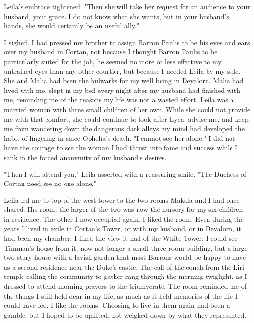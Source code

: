\documentclass{article}
\begin{document}
Leila's embrace tightened. "Then she will take her request for an audience to your husband, your grace. I do not know what she wants, but in your husband's hands, she would certainly be an useful ally." 

I sighed. I had pressed my brother to assign Barron Paulis to be his eyes and ears over my husband in Cortan, not because I thought Barron Paulis to be particularly suited for the job, he seemed no more or less effective to my untrained eyes than any other courtier, but because I needed Leila by my side. She and Malia had been the bulwarks for my well being in Deyalorn. Malia had lived with me, slept in my bed every night after my husband had finished with me, reminding me of the reasons my life was not a wasted effort. Leila was a married woman with three small children of  her own. While she could not provide me with that comfort, she could continue to look after Lyca, advise me, and keep me from wandering down the dangerous dark alleys my mind had developed the habit of lingering in since Ophelia's death. "I cannot see her alone." I did not have the courage to see the woman I had thrust into fame and success while I sank in the forced anonymity of my husband's desires. 

"Then I will attend you," Leila asserted with a reassuring smile. "The Duchess of Cortan need see no one alone."

Leila led me to top of the west tower to the two rooms Makala and I had once shared. His room, the larger of the two was now the nursery for my six children in residence. The other I now occupied again. I liked the room. Even during the years I lived in exile in Cortan's Tower, or with my husband, or in Deyalorn, it had been my chamber. I liked the view it had of the White Tower. I could see Timmon's house from it, now not longer a small three room building, but a large two story house with a lavish garden that most Barrons would be happy to have as a second residence near the Duke's castle. The call of the conch from the Liri temple calling the community to gather rang through the morning twiglight, as I dressed to attend morning prayers to the triumverate. The room reminded me of the things I still held dear in my life, as much as it held memories of the life I could have led. I like the rooms. Choosing to live in them again had been a gamble, but I hoped to be uplifted, not weighed down by what they represented.
\end{document}
